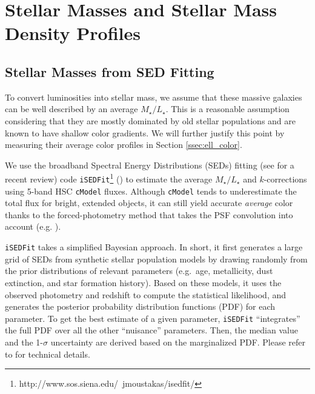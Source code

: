 \documentclass[a4paper,fleqn,usenatbib]{mnras}
\def\cmodel{\texttt{cModel}}
\def\m2l{{$M_{\star}/L_{\star}$}}
\begin{document}
\section{Stellar Masses and Stellar Mass Density Profiles}
    \label{sec:mstar}
    
\subsection{Stellar Masses from SED Fitting}
    \label{ssec:isedfit}
   
    To convert luminosities into stellar mass, we assume that these massive galaxies 
    can be well described by an average \m2l{}. 
    This is a reasonable assumption considering that they are mostly dominated by 
    old stellar populations and are known to have shallow color gradients. 
    We will further justify this point by measuring their average color profiles in 
    Section \ref{ssec:ell_color}.

    We use the broadband Spectral Energy Distributions (SEDs) fitting 
    (see \citealt{Walcher2011} for a recent review) code 
    \texttt{iSEDFit}\footnote{http://www.sos.siena.edu/~jmoustakas/isedfit/} 
    (\citealt{Moustakas13}) to estimate the average \m2l{} and $k$-corrections using
    5-band HSC \cmodel{} fluxes. 
    Although \cmodel{} tends to underestimate the total flux for bright, extended 
    objects, it can still yield accurate \emph{average} color thanks to the 
    forced-photometry method that takes the PSF convolution into account
    (e.g. \citealt{SynPipeInPrep}). 

    \texttt{iSEDFit} takes a simplified Bayesian approach. 
    In short, it first generates a large grid of SEDs from synthetic stellar population 
    models by drawing randomly from the prior distributions of relevant parameters 
    (e.g.\ age, metallicity, dust extinction, and star formation history).
    Based on these models, it uses the observed photometry and redshift to compute the 
    statistical likelihood, and generates the posterior probability distribution 
    functions (PDF) for each parameter.  
    To get the best estimate of a given parameter, \texttt{iSEDFit} ``integrates'' the 
    full PDF over all the other ``nuisance'' parameters.
    Then, the median value and the 1-$\sigma$ uncertainty are derived based on the 
    marginalized PDF. 
    Please refer to \citet{Moustakas13} for technical details. 
    
\end{document}
